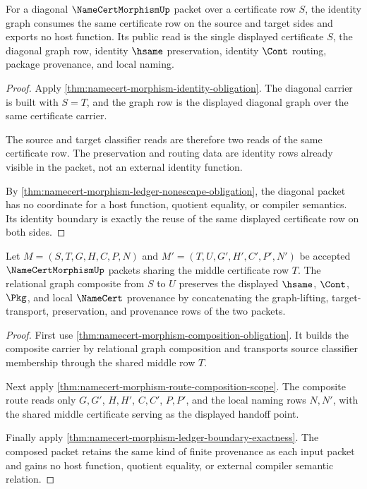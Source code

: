 \begin{theorem}
\label{thm:namecert-morphism-identity-boundary}
For a diagonal $\NameCertMorphismUp$ packet over a certificate row $S$, the identity graph consumes the same certificate row on the source and target sides and exports no host function. Its public read is the single displayed certificate $S$, the diagonal graph row, identity $\hsame$ preservation, identity $\Cont$ routing, package provenance, and local naming.
\end{theorem}

\begin{proof}
Apply \autoref{thm:namecert-morphism-identity-obligation}. The diagonal carrier is built with $S=T$, and the graph row is the displayed diagonal graph over the same certificate carrier.

The source and target classifier reads are therefore two reads of the same certificate row. The preservation and routing data are identity rows already visible in the packet, not an external identity function.

By \autoref{thm:namecert-morphism-ledger-nonescape-obligation}, the diagonal packet has no coordinate for a host function, quotient equality, or compiler semantics. Its identity boundary is exactly the reuse of the same displayed certificate row on both sides.
\end{proof}

\begin{theorem}
\label{thm:namecert-morphism-composite-route-provenance}
Let $M=(S,T,G,H,C,P,N)$ and $M'=(T,U,G',H',C',P',N')$ be accepted $\NameCertMorphismUp$ packets sharing the middle certificate row $T$. The relational graph composite from $S$ to $U$ preserves the displayed $\hsame$, $\Cont$, $\Pkg$, and local $\NameCert$ provenance by concatenating the graph-lifting, target-transport, preservation, and provenance rows of the two packets.
\end{theorem}

\begin{proof}
First use \autoref{thm:namecert-morphism-composition-obligation}. It builds the composite carrier by relational graph composition and transports source classifier membership through the shared middle row $T$.

Next apply \autoref{thm:namecert-morphism-route-composition-scope}. The composite route reads only $G,G'$, $H,H'$, $C,C'$, $P,P'$, and the local naming rows $N,N'$, with the shared middle certificate serving as the displayed handoff point.

Finally apply \autoref{thm:namecert-morphism-ledger-boundary-exactness}. The composed packet retains the same kind of finite provenance as each input packet and gains no host function, quotient equality, or external compiler semantic relation.
\end{proof}

